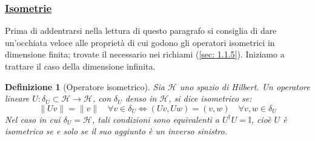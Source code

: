 \documentclass[a4paper,12pt]{report}
\newtheorem{definizione}{Definizione}[chapter]
\begin{document}
\subsubsection{\underline{Isometrie}}

Prima di addentrarsi nella lettura di questo paragrafo si consiglia di dare un'occhiata veloce alle proprietà di cui godono gli operatori isometrici in dimensione finita; trovate il necessario nei richiami (\ref{sec: 1.1.5}). Iniziamo a trattare il caso della dimensione infinita.

\begin{definizione}[Operatore isometrico]
Sia $\mathscr{H}$ uno spazio di Hilbert. Un operatore lineare $U:\delta_U\subset\mathscr{H}\to \mathscr{H}$, con $\delta_U$ denso in $\mathscr{H}$, si dice isometrico se:
\[
\|Uv\|=\|v\| \quad \forall v\in \delta_U \iff
(Uv,Uw)=(v,w)\quad \forall v,w\in \delta_U
\]
Nel caso in cui $\delta_U=\mathscr{H}$, tali condizioni sono equivalenti a $U^\dagger U=\mathbb{I}$, cioè $U$ è isometrico se e solo se il suo aggiunto è un inverso sinistro.
\end{definizione}
\end{document}
